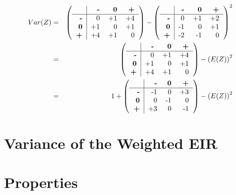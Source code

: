\documentclass[12pt,a4paper,oneside]{book}
\begin{document}
\begin{eqnarray*}
Var(Z) &=& 
\left(\begin{tabular}{r|r r r}
    			& \textbf{-} & \textbf{0} & \textbf{+} \\\hline
    \textbf{-} 	& 0		& +1	& +4	\\
    \textbf{0} 	& +1	& 0		& +1	\\
    \textbf{+} 	& +4	& +1	& 0		\\
\end{tabular} \right)
- \left(
\begin{tabular}{r|r r r}
    			& \textbf{-} & \textbf{0} & \textbf{+} \\\hline
    \textbf{-} 	& 0		& +1	& +2	\\
    \textbf{0} 	& -1	& 0		& +1	\\
    \textbf{+} 	& -2	& -1	& 0		\\
\end{tabular}
\right)^2  \\
&=& \left( \begin{tabular}{r|r r r}
    			& \textbf{-} & \textbf{0} & \textbf{+} \\\hline
    \textbf{-} 	& 0		& +1	& +4	\\
    \textbf{0} 	& +1	& 0		& +1	\\
    \textbf{+} 	& +4	& +1	& 0		\\
\end{tabular} \right)
- \left(E(Z)\right)^2 	\\
&=& 1 +  \left(\begin{tabular}{r|r r r}
    			& \textbf{-} & \textbf{0} & \textbf{+} \\\hline
    \textbf{-} 	& -1	& 0		& +3	\\
    \textbf{0} 	& 0		& -1	& 0	\\
    \textbf{+} 	& +3	& 0		& -1		\\
\end{tabular} \right)
 - \left(E(Z)\right)^2	\\
\end{eqnarray*}







\section{Variance of the Weighted EIR}


\section{Properties}
\end{document}
